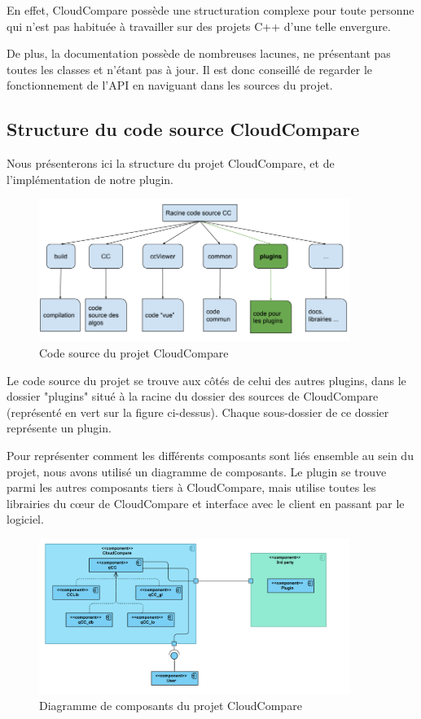 \documentclass[12pt,titlepage,french]{article}
\begin{document}
En effet, CloudCompare possède une structuration complexe pour toute personne qui n'est pas habituée à travailler sur des projets C++ d'une telle envergure.

De plus, la documentation possède de nombreuses lacunes, ne présentant pas toutes les classes et n'étant pas à jour.
Il est donc conseillé de regarder le fonctionnement de l'API en naviguant dans les sources du projet.

\subsection{Structure du code source CloudCompare}

Nous présenterons ici la structure du projet CloudCompare, et de l'implémentation de notre plugin.

\begin{figure}[H]
\center
  \includegraphics[width=0.9\textwidth]{./img/structure_code.PNG}
  \caption{\label{} Code source du projet CloudCompare}
\end{figure}

Le code source du projet se trouve aux côtés de celui des autres plugins, dans le dossier "plugins" situé à la racine du dossier des sources de CloudCompare (représenté en vert sur la figure ci-dessus). Chaque sous-dossier de ce dossier représente un plugin. \newline

Pour représenter comment les différents composants sont liés ensemble au sein du projet, nous avons utilisé un diagramme de composants. Le plugin se trouve parmi les autres composants tiers à CloudCompare, mais utilise toutes les librairies du cœur de CloudCompare et interface avec le client en passant par le logiciel.

\begin{figure}[H]
\center
  \includegraphics[width=0.9\textwidth]{./img/component_diagr.png}
  \caption{\label{} Diagramme de composants du projet CloudCompare}
\end{figure}
\end{document}

